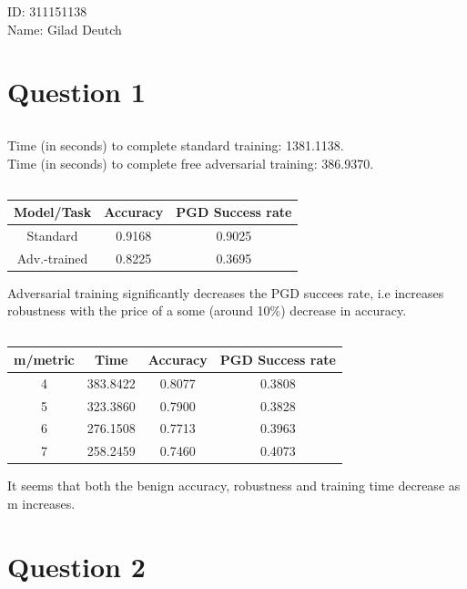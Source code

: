 \documentclass{article}
\begin{document}
ID: 311151138 \\
Name: Gilad Deutch \\

\section{Question 1}
\setcounter{subsection}{2}
\subsection{}
Time (in seconds) to complete standard training: 1381.1138. \\
Time (in seconds) to complete free adversarial training: 386.9370.
\subsection{}
\begin{center}
\begin{tabular}{||c c c||} 
    \hline
    Model/Task & Accuracy & PGD Success rate \\ [0.5ex] 
    \hline\hline
    Standard & 0.9168 & 0.9025 \\ 
    \hline
    Adv.-trained & 0.8225 & 0.3695 \\
    \hline 
\end{tabular}
\end{center}
Adversarial training significantly decreases the PGD succees rate, i.e increases robustness with the price of a some (around 10\%) decrease in accuracy.
\subsection{}
\begin{center}
\begin{tabular}{||c c c c||} 
    \hline
    m/metric & Time & Accuracy & PGD Success rate \\ [0.5ex] 
    \hline\hline
    4 & 383.8422 & 0.8077 & 0.3808 \\ 
    \hline
    5 & 323.3860 & 0.7900 & 0.3828 \\
    \hline
    6 & 276.1508 & 0.7713 & 0.3963 \\
    \hline
    7 & 258.2459 & 0.7460 & 0.4073 \\
    \hline 
\end{tabular}
\end{center}
It seems that both the benign accuracy, robustness and training time decrease as m increases.
\section{Question 2}
\setcounter{subsection}{1}
\end{document}
